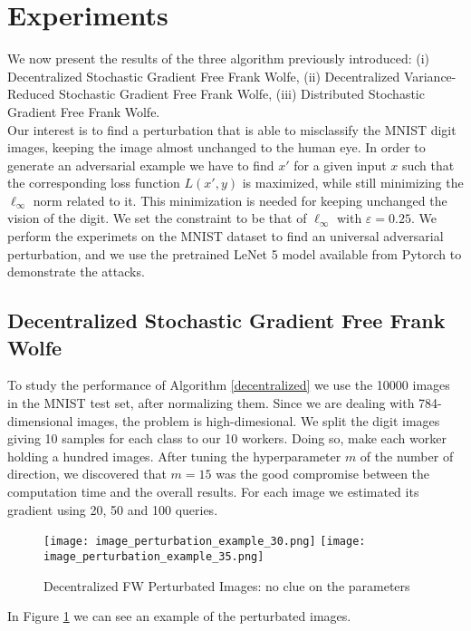 \section{Experiments}
We now present the results of the three algorithm previously introduced: (i) Decentralized Stochastic Gradient Free Frank Wolfe, (ii) Decentralized Variance-Reduced Stochastic Gradient Free Frank Wolfe, (iii) Distributed Stochastic Gradient Free Frank Wolfe.\\
Our interest is to find a perturbation that is able to misclassify the MNIST digit images, keeping the image almost unchanged to the human eye. In order to generate an adversarial example we have to find $x'$ for a given input $x$ such that the corresponding loss function $L(x',y)$ is maximized, while still minimizing the $\ell_{\infty}$ norm related to it. This minimization is needed for keeping unchanged the vision of the digit. We set the constraint to be that of $\ell_{\infty}$ with $\varepsilon=0.25$. We perform the experimets on the MNIST dataset to find an universal adversarial perturbation, and we use the pretrained LeNet 5 model available from Pytorch to demonstrate the attacks.

\subsection{Decentralized Stochastic Gradient Free Frank Wolfe}
To study the performance of Algorithm \ref{decentralized} we use the 10000 images in the MNIST test set, after normalizing them. Since we are dealing with 784-dimensional images, the problem is high-dimesional. We split the digit images giving 10 samples for each class to our 10 workers. Doing so, make each worker holding a hundred images. After tuning the hyperparameter $m$ of the number of direction, we discovered that $m=15$ was the good compromise between the computation time and the overall results. For each image we estimated its gradient using 20, 50 and 100 queries.

\begin{figure}[htbp]
	\centering
	\texttt{[image: image\_perturbation\_example\_30.png]}\hfil
	\texttt{[image: image\_perturbation\_example\_35.png]}
	\caption{Decentralized FW Perturbated Images: no clue on the parameters}
	\label{fig:decentralized}
\end{figure}
In Figure \ref{fig:decentralized} we can see an example of the perturbated images.

